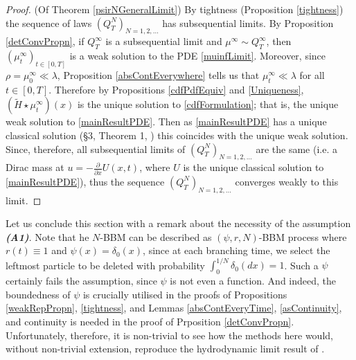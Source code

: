 \documentclass{article}
\begin{document}
\begin{proof}(Of Theorem \ref{psirNGeneralLimit})
    By tightness (Proposition \ref{tightness}) the sequence of laws $(Q^N_T)_{N=1,2,\ldots}$ has subsequential limits. By Proposition \ref{detConvPropn}, if $Q^\infty_T$ is a subsequential limit and $\mu^\infty\sim Q^\infty_T$, then $(\mu_t^\infty)_{t\in [0,T]}$ is a weak solution to the PDE \eqref{muinfLimit}. Moreover, since $\rho=\mu^\infty_0\ll \lambda$, Proposition \ref{absContEverywhere} tells us that $\mu_t^\infty\ll \lambda$ for all $t\in [0,T]$. Therefore by Propositions \ref{cdfPdfEquiv} and \ref{Uniqueness}, $(\tilde{H}\star \mu_t^\infty)(x)$ is the unique solution to \eqref{cdfFormulation}; that is, the unique weak solution to \eqref{mainResultPDE}. Then as \eqref{mainResultPDE} has a unique classical solution (\S3, Theorem 1, \cite{kpp}) this coincides with the unique weak solution. Since, therefore, all subsequential limits of $(Q^N_T)_{N=1,2,\ldots}$ are the same (i.e. a Dirac mass at $u=-\frac{\partial}{\partial x}U(x,t)$, where $U$ is the unique classical solution to \eqref{mainResultPDE}), thus the sequence $(Q^N_T)_{N=1,2,\ldots}$ converges weakly to this limit. 
\end{proof}

Let us conclude this section with a remark about the necessity of the assumption \textit{\textbf{(A1)}}. Note that he $N$-BBM can be described as $(\psi,r,N)$-BBM process where $r(t)\equiv 1$ and $\psi(x)=\delta_0(x)$, since at each branching time, we select the leftmost particle to be deleted with probability $\int_0^{1/N}\delta_0(dx)=1$. Such a $\psi$ certainly fails the assumption, since $\psi$ is not even a function. And indeed, the boundedness of $\psi$ is crucially utilised in the proofs of Propositions \ref{weakRepPropn}, \ref{tightness}, and Lemmas \ref{absContEveryTime}, \ref{asContinuity}, and continuity is needed in the proof of Prposition \ref{detConvPropn}. Unfortunately, therefore, it is non-trivial to see how the methods here would, without non-trivial extension, reproduce the hydrodynamic limit result of \cite{hydroNBBM}. 
\end{document}
